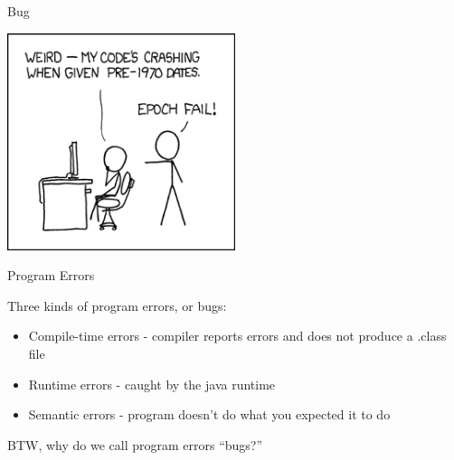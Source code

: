 \documentclass{beamer}
\author[Chris Simpkins] 
{Christopher Simpkins \\\texttt{chris.simpkins@gatech.edu}}
\institute[Georgia Tech] %
\date{}
\begin{document}
\begin{frame}
  \titlepage
\end{frame}


\begin{frame}[fragile]{Bug}

\begin{center}
\includegraphics[height=2.5in]{bug.png}\\
\end{center}

\end{frame}



\begin{frame}[fragile]{Program Errors}


Three kinds of program errors, or bugs:
\begin{itemize}
\item Compile-time errors - compiler reports errors and does not produce a .class file
\item Runtime errors - caught by the java runtime
\item Semantic errors - program doesn't do what you expected it to do
\end{itemize}
\vspace{.2in}
BTW, why do we call program errors ``bugs?''

\end{frame}
\end{document}

